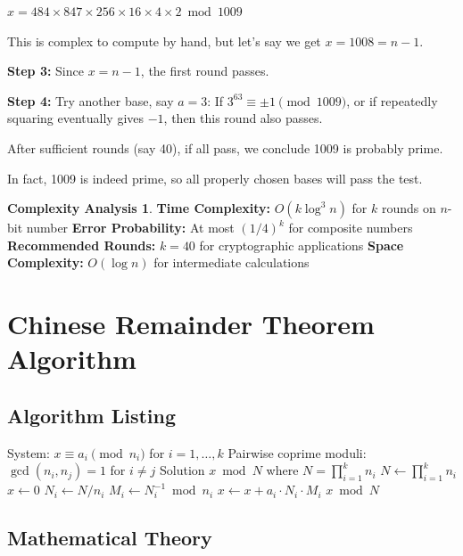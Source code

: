 \documentclass[12pt,a4paper]{article}
\theoremstyle{definition}
\newtheorem{complexity}{Complexity Analysis}[section]
\begin{document}
$x = 484 \times 847 \times 256 \times 16 \times 4 \times 2 \bmod 1009$

This is complex to compute by hand, but let's say we get $x = 1008 = n-1$.

\textbf{Step 3:} Since $x = n-1$, the first round passes.

\textbf{Step 4:} Try another base, say $a = 3$:
If $3^{63} \equiv \pm 1 \pmod{1009}$, or if repeatedly squaring eventually gives $-1$, then this round also passes.

After sufficient rounds (say 40), if all pass, we conclude 1009 is probably prime.

In fact, 1009 is indeed prime, so all properly chosen bases will pass the test.

\begin{complexity}
\textbf{Time Complexity:} $O(k \log^3 n)$ for $k$ rounds on $n$-bit number
\textbf{Error Probability:} At most $(1/4)^k$ for composite numbers
\textbf{Recommended Rounds:} $k = 40$ for cryptographic applications
\textbf{Space Complexity:} $O(\log n)$ for intermediate calculations
\end{complexity}

\section{Chinese Remainder Theorem Algorithm}

\subsection{Algorithm Listing}

\begin{algorithm}[H]
\caption{Chinese Remainder Theorem}
\label{alg:crt}
\begin{algorithmic}[1]
\REQUIRE System: $x \equiv a_i \pmod{n_i}$ for $i = 1, \ldots, k$
\REQUIRE Pairwise coprime moduli: $\gcd(n_i, n_j) = 1$ for $i \neq j$
\ENSURE Solution $x \bmod N$ where $N = \prod_{i=1}^k n_i$
\STATE $N \leftarrow \prod_{i=1}^k n_i$
\STATE $x \leftarrow 0$
    \STATE $N_i \leftarrow N / n_i$
    \STATE $M_i \leftarrow N_i^{-1} \bmod n_i$ 
    \STATE $x \leftarrow x + a_i \cdot N_i \cdot M_i$
\ENDFOR
\RETURN $x \bmod N$
\end{algorithmic}
\end{algorithm}

\subsection{Mathematical Theory}
\end{document}
